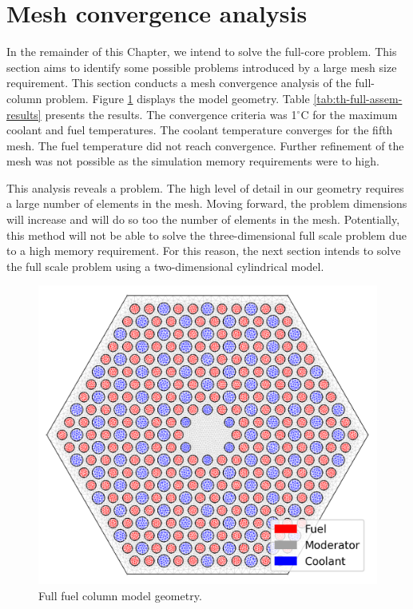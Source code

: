\section{Mesh convergence analysis}

In the remainder of this Chapter, we intend to solve the full-core problem.
This section aims to identify some possible problems introduced by a large mesh size requirement.
This section conducts a mesh convergence analysis of the full-column problem.
Figure \ref{fig:th-full-assem-mesh} displays the model geometry.
Table \ref{tab:th-full-assem-results} presents the results.
The convergence criteria was 1$^{\circ}$C for the maximum coolant and fuel temperatures.
The coolant temperature converges for the fifth mesh.
The fuel temperature did not reach convergence.
Further refinement of the mesh was not possible as the simulation memory requirements were to high.

This analysis reveals a problem.
The high level of detail in our geometry requires a large number of elements in the mesh.
Moving forward, the problem dimensions will increase and will do so too the number of elements in the mesh.
Potentially, this method will not be able to solve the three-dimensional full scale problem due to a high memory requirement.
For this reason, the next section intends to solve the full scale problem using a two-dimensional cylindrical model.

\begin{figure}[htbp!]
  \centering
  \includegraphics[width=0.45\linewidth]{figures-thermal/full-assem-mesh2}
  \hfill
  \caption{Full fuel column model geometry.}
  \label{fig:th-full-assem-mesh}
\end{figure}


